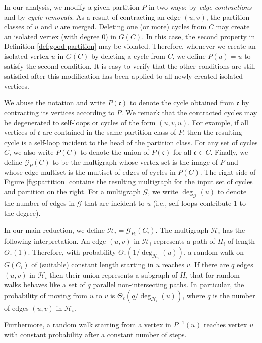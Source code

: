 \documentclass[11pt]{article}
\newcommand{\eps}{\ensuremath{\epsilon}}
\def\epsilon{\ensuremath{\varepsilon}}
\begin{document}
In our analysis, we modify a given partition $P$ in two ways: by \emph{edge contractions} and by \emph{cycle removals}. As a result of contracting an edge $(u,v)$, the partition classes of $u$ and $v$ are merged. Deleting one (or more) cycles from $C$ may create an isolated vertex (with degree $0$) in $G(C)$. In this case, the second property in Definition \ref{def:good-partition} may be violated. Therefore, whenever we create an isolated vertex $u$ in $G(C)$ by deleting a cycle from $C$, we define $P(u) = u$ to satisfy the second condition. It is easy to verify that the other conditions are still satisfied after this modification has been applied to all newly created isolated vertices.

We abuse the notation and write $P(\mathfrak{c})$ to denote the cycle obtained from $\mathfrak{c}$ by contracting its vertices according to $P$. We remark that the contracted cycles may be degenerated to self-loops or cycles of the form $(u,v,u)$. For example, if all vertices of $\mathfrak{c}$ are contained in the same partition class of $P$, then the resulting cycle is a self-loop incident to the head of the partition class. For any set of cycles $C$, we also write $P(C)$ to denote the union of $P(\mathfrak{c})$ for all $\mathfrak{c} \in C$. Finally, we define $\mathcal G_{P}(C)$ to be the multigraph whose vertex set is the image of $P$ and whose edge multiset is the multiset of edges of cycles in $P(C)$. The right side of Figure \ref{fig:partition} contains the resulting multigraph for the input set of cycles and partition on the right.
For a multigraph $\mathcal G$, we write $\deg_{\mathcal G}(u)$ to denote the number of edges in $\mathcal G$ that are incident to $u$ (i.e., self-loops contribute $1$ to the degree).

In our main reduction, we define $\mathcal H_i = \mathcal G_{P_i}(C_i)$. The multigraph $\mathcal H_i$ has the following interpretation. An edge $(u,v)$ in $\mathcal H_i$ represents a path of $H_i$ of length $O_\eps(1)$. Therefore, with probability $\Theta_{\eps}(1/\deg_{\mathcal H_i}(u))$, a random walk on $G(C_i)$ of (suitable) constant length starting in $u$ reaches $v$. If there are $q$ edges $(u,v)$ in $\mathcal H_i$ then their union represents a subgraph of $H_i$ that for random walks behaves like a set of $q$ parallel non-intersecting paths. In particular, the probability of moving from $u$ to $v$ is $\Theta_{\eps}(q/\deg_{\mathcal H_i}(u))$, where $q$ is the number of edges $(u,v)$ in $\mathcal H_i$.

Furthermore, a random walk starting from a vertex in $P^{-1}(u)$ reaches  vertex $u$ with constant probability after a constant number of steps.
\end{document}
